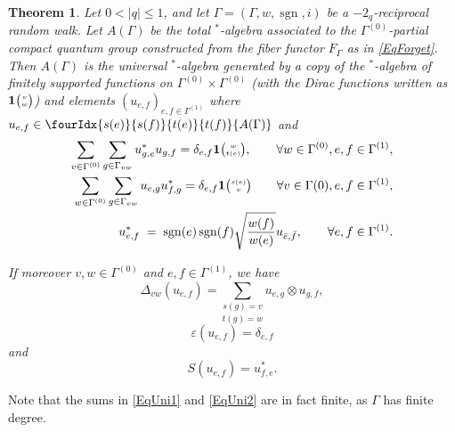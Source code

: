 \documentclass[10pt]{article}
\DeclareMathOperator{\sgn}{\mathrm{sgn}}
\newcommand{\Grt}[3]{#1{\tiny{\begin{pmatrix} #2\\#3\end{pmatrix}}}}
\newcommand{\UnitC}[2]{\Grt{\mathbf{1}}{#1}{#2}}
\newcommand{\Grru}[2]{{\tiny \begin{pmatrix} #1 \\ #2\end{pmatrix}}}
\newcommand{\Gr}[5]{\fourIdx{#2}{#4}{#3}{#5}{#1}}%
\newtheorem{Theorem}{Theorem}[section]
\theoremstyle{definition}
\numberwithin{equation}{section}
\begin{document}
\begin{Theorem}\label{TheoGenRel} Let $0<|q|\leq 1$, and let $\Gamma = (\Gamma,w,\sgn,i)$ be a $-2_q$-reciprocal random walk. Let $A(\Gamma)$ be the total $^*$-algebra associated to the $\Gamma^{(0)}$-partial compact quantum group constructed from the fiber functor $F_{\Gamma}$ as in \eqref{EqForget}. Then $A(\Gamma)$ is the universal $^*$-algebra generated by a copy of the $^*$-algebra of finitely supported functions on $\Gamma^{(0)}\times \Gamma^{(0)}$ (with the Dirac functions written as $\UnitC{v}{w}$) and elements $(u_{e,f})_{e,f\in \Gamma^{(1)}}$ where $u_{e,f}\in \Gr{A(\Gamma)}{s(e)}{t(e)}{s(f)}{t(f)}$ and 
\begin{eqnarray} 
\label{EqUni1}\sum_{v\in \Gamma^{(0)}}\sum_{g\in \Gamma_{vw}} u_{g,e}^*u_{g,f} = \delta_{e,f}\mathbf{1}\Grru{w}{t(e)}, \qquad \forall w\in \Gamma^{(0)}, e,f\in \Gamma^{(1)},\\ %
\label{EqUni2}\sum_{w\in \Gamma^{(0)}} \sum_{g\in \Gamma_{vw}} u_{e,g}u_{f,g}^* = \delta_{e,f} \mathbf{1}\Grru{s(e)}{v}\qquad \forall v\in \Gamma{(0)}, e,f\in \Gamma^{(1)},\\ 
\label{EqInt}u_{e,f}^* \;=\; \sgn(e)\sgn(f)\sqrt{\frac{w(f)}{w(e)}} u_{\bar{e},\bar{f}},\qquad \forall e,f\in \Gamma^{(1)}.
\end{eqnarray}

If moreover $v,w\in \Gamma^{(0)}$ and $e,f\in \Gamma^{(1)}$, we have \[\Delta_{vw}(u_{e,f}) = \underset{t(g) = w}{\sum_{s(g) = v}} u_{e,g}\otimes u_{g,f},\]
\[\varepsilon(u_{e,f}) = \delta_{e,f}\] and \[S(u_{e,f}) = u_{f,e}^*.\] 
\end{Theorem} 

Note that the sums in \eqref{EqUni1} and \eqref{EqUni2} are in fact finite, as $\Gamma$ has finite degree. 
\end{document}
